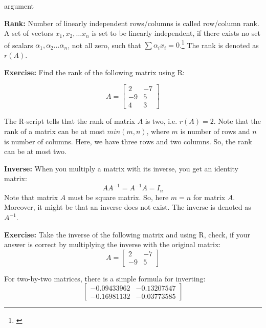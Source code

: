 \begin{labeling}{argument}
    \item[\textbf{Rank:}] Number of linearly independent rows/columns is called row/column rank. A set of vectors $x_1, x_2, \ldots x_n$ is set to be linearly independent, if there exists no set of scalars $\alpha_1, \alpha_2 \ldots \alpha_n$, not all zero, such that $\sum \alpha_i x_i = 0$.\footnote{\cite[][see page 8]{MagnusNeudecker-2019-part1}} The rank is denoted as $r(A)$.

    \textbf{Exercise:} Find the rank of the following matrix using R:

    \[
        A = \begin{bmatrix}
            2  & -7 \\
            -9 & 5  \\
            4  & 3
        \end{bmatrix}
    \]

    \begin{sol}
        

        The R-script tells that the rank of matrix $A$ is two, i.e. $r(A) = 2$. Note that the rank of a matrix can be at most $min(m, n)$, where $m$ is number of rows and $n$ is number of columns. Here, we have three rows and two columns. So, the rank can be at most two.
    \end{sol}

    \item[\textbf{Inverse:}] When you multiply a matrix with its inverse, you get an identity matrix:
    \[
        A A^{-1} = A^{-1} A = I_n
    \]
    Note that matrix $A$ must be square matrix. So, here $m = n$ for matrix $A$. Moreover, it might be that an inverse does not exist. The inverse is denoted as $A^{-1}$.

    \textbf{Exercise:} Take the inverse of the following matrix and using R, check, if your answer is correct by multiplying the inverse with the original matrix:
    \[
        A = \begin{bmatrix}
            2  & -7 \\
            -9 & 5
        \end{bmatrix}
    \]

    \begin{sol}
        For two-by-two matrices, there is a simple formula for inverting:
        \[
            \begin{bmatrix}
                -0.09433962 & -0.13207547 \\
                -0.16981132 & -0.03773585
            \end{bmatrix}
        \]
    \end{sol}


\end{labeling}
